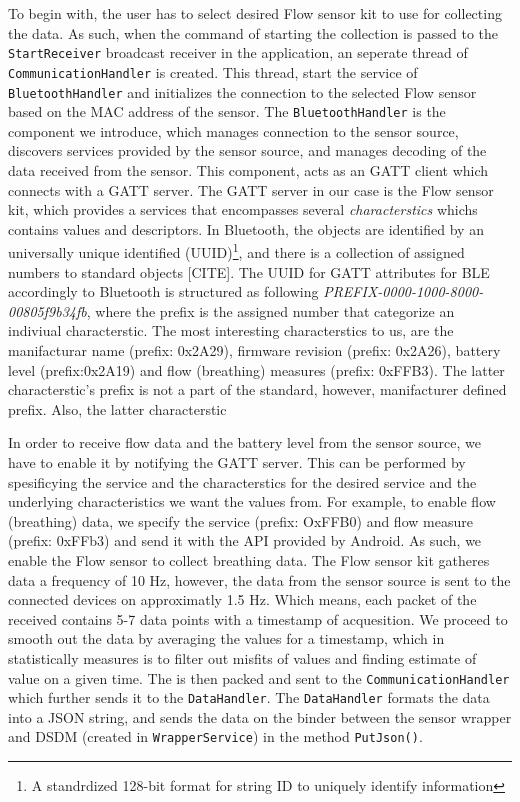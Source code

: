To begin with, the user has to select desired Flow sensor kit to use for collecting the data. As such, when the command of starting the collection is passed to the \verb|StartReceiver| broadcast receiver in the application, an seperate thread of \verb|CommunicationHandler| is created. This thread, start the service of \verb|BluetoothHandler| and initializes the connection to the selected Flow sensor based on the MAC address of the sensor. The \verb|BluetoothHandler| is the component we introduce, which manages connection to the sensor source, discovers services provided by the sensor source, and manages decoding of the data received from the sensor. This component, acts as an GATT client which connects with a GATT server. The GATT server in our case is the Flow sensor kit, which provides a services that encompasses several \textit{characterstics} whichs contains values and descriptors. In Bluetooth, the objects are identified by an universally unique identified (UUID)\footnote{A standrdized 128-bit format for string ID to uniquely identify information}, and there is a collection of assigned numbers to standard objects [CITE]. The UUID for GATT attributes for BLE accordingly to Bluetooth is structured as following \textit{PREFIX-0000-1000-8000-00805f9b34fb}, where the prefix is the assigned number that categorize an indiviual characterstic. The most interesting characterstics to us, are the manifacturar name (prefix: 0x2A29), firmware revision (prefix: 0x2A26), battery level (prefix:0x2A19) and flow (breathing) measures (prefix: 0xFFB3). The latter characterstic's prefix is not a part of the standard, however, manifacturer defined prefix. Also, the latter characterstic

In order to receive flow data and the battery level from the sensor source, we have to enable it by notifying the GATT server. This can be performed by spesificying the service and the characterstics for the desired service and the underlying characteristics we want the values from. For example, to enable flow (breathing) data, we specify the service (prefix: OxFFB0) and flow measure (prefix: 0xFFb3) and send it with the API provided by Android.  As such, we enable the Flow sensor to collect breathing data. The Flow sensor kit gatheres data a frequency of 10 Hz, however, the data from the sensor source is sent to the connected devices on approximatly 1.5 Hz. Which means, each packet of the received contains 5-7 data points with a timestamp of acquesition. We proceed to smooth out the data by averaging the values for a timestamp, which in statistically measures is to filter out misfits of values and finding estimate of value on a given time. The is then packed and sent to the \verb|CommunicationHandler| which further sends it to the \verb|DataHandler|. The \verb|DataHandler| formats the data into a JSON string, and sends the data on the binder between the sensor wrapper and DSDM (created in \verb|WrapperService|) in the method \verb|PutJson()|. 


